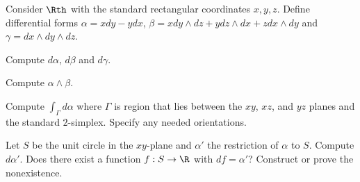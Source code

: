 Consider $\Rth$ with the standard rectangular coordinates
$x,y,z$. Define differential forms $\alpha= x dy-ydx$,
$\beta=xdy\wedge dz+y dz\wedge dx + z dx \wedge dy$ and
$\gamma=dx\wedge dy\wedge dz$.
\begin{alist}
\item Compute $d\alpha$, $d\beta$ and $d\gamma$.
\item Compute $\alpha\wedge \beta$.
\item Compute $\int_{\Gamma}d\alpha$ where $\Gamma$ is region that
lies between the $xy$, $xz$, and $yz$ planes and the standard
$2$-simplex. Specify any needed orientations.
\item Let $S$ be the unit circle in the $xy$-plane and $\alpha'$ the
restriction of $\alpha$ to $S$. Compute $d\alpha'$. Does there exist a
function $f:S\rightarrow \R$ with $df=\alpha'$? Construct or prove the
nonexistence.
\end{alist}
